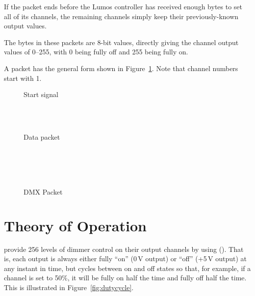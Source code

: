 \documentclass[letterpaper,twoside,onecolumn,openright,final]{memoir}
\begin{document}
\begin{NotImplemented*}
If the packet ends before the Lumos controller has received enough bytes to set all of its channels,
the remaining channels simply keep their previously-known output values.

The bytes in these packets are 8-bit values, directly giving the channel output values of 0--255, with 0
being fully off and 255 being fully on.

A packet has the general form shown in Figure~\ref{fig:dmx}. Note that  
channel numbers start with 1.
\begin{figure}
 \begin{BF}
  \begin{rightwordgroup}{Start signal}
	  \\
	  \\
  \end{rightwordgroup}\\
  \begin{rightwordgroup}{Data packet}
  \\
  \\
  \\
  \\
   \\
  \end{rightwordgroup}
 \end{BF}
 \caption{DMX Packet\label{fig:dmx}}
\end{figure}
\end{NotImplemented*}
\chapter{Theory of Operation}\label{ch:too}
 provide 256 levels of dimmer control on their
output channels by using  ().  That is, each output
is always either fully ``on'' (0\,V output) or ``off'' (+5\,V output) at any instant in
time, but cycles between on and off states so that, for example, if a channel is set
to 50\%, it will be fully on half the time and fully off half the time.  This is
illustrated in Figure~\ref{fig:dutycycle}.

\end{document}
